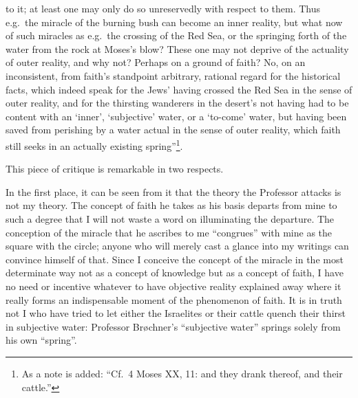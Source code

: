 \documentclass[12pt]{book}
\newcommand{\opage}[1]{\marginnote{\footnotesize\textit{[#1]}}}
\begin{document}
\opage{6}\setcounter{footnote}{0}%
to it; at least one may only do so unreservedly with respect to them. Thus
e.g.\ the miracle of the burning bush can become an inner reality, but what
now of such miracles as e.g.\ the crossing of the Red Sea, or the springing
forth of the water from the rock at Moses's blow? These one may not deprive
of the actuality of outer reality, and why not? Perhaps on a ground of
faith? No, on an inconsistent, from faith's standpoint arbitrary, rational
regard for the historical facts, which indeed speak for the Jews' having
crossed the Red Sea in the sense of outer reality, and for the thirsting
wanderers in the desert's not having had to be content with an `inner',
`subjective' water, or a `to-come' water, but having been saved from
perishing by a water actual in the sense of outer reality, which faith still
seeks in an actually existing spring''\footnote{As a note is added:
``Cf.\ 4 Moses XX, 11: and they drank thereof, and their cattle.''}.

This piece of critique is remarkable in two respects.

In the first place, it can be seen from it that the theory the Professor
attacks is not my theory. The concept of faith he takes as his basis departs
from mine to such a degree that I will not waste a word on illuminating the
departure. The conception of the miracle that he ascribes to me
``congrues'' with mine as the square with the circle; anyone who will merely
cast a glance into my writings can convince himself of that. Since I
conceive the concept of the miracle in the most determinate way not as a
concept of knowledge but as a concept of faith, I have no need or incentive
whatever to have objective reality explained away where it really forms an
indispensable moment of the phenomenon of faith. It is in truth not I who
have tried to let either the Israelites or their cattle quench
\opage{7}\setcounter{footnote}{0}%
their thirst in subjective water: Professor Brøchner's ``subjective water''
springs solely from his own ``spring''.
\end{document}
